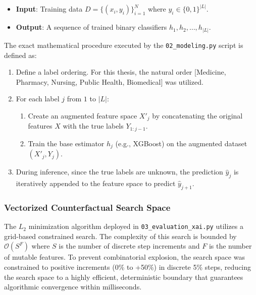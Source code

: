 \begin{itemize}
    \item \textbf{Input}: Training data $D = \{(x_i, y_i)\}_{i=1}^N$ where $y_i \in \{0,1\}^{|L|}$.
    \item \textbf{Output}: A sequence of trained binary classifiers $h_1, h_2, \dots, h_{|L|}$.
\end{itemize}
The exact mathematical procedure executed by the \texttt{02\_modeling.py} script is defined as:
\begin{enumerate}
    \item Define a label ordering. For this thesis, the natural order [Medicine, Pharmacy, Nursing, Public Health, Biomedical] was utilized.
    \item For each label $j$ from $1$ to $|L|$:
    \begin{enumerate}
        \item Create an augmented feature space $X'_j$ by concatenating the original features $X$ with the true labels $Y_{1:j-1}$.
        \item Train the base estimator $h_j$ (e.g., XGBoost) on the augmented dataset $(X'_j, Y_j)$.
    \end{enumerate}
    \item During inference, since the true labels are unknown, the prediction $\hat{y}_j$ is iteratively appended to the feature space to predict $\hat{y}_{j+1}$.
\end{enumerate}

\subsubsection{Vectorized Counterfactual \parencite{wachter2017counterfactual} Search Space}
The $L_2$ minimization algorithm deployed in \texttt{03\_evaluation\_xai.py} utilizes a grid-based constrained search. The complexity of this search is bounded by $\mathcal{O}(S^F)$ where $S$ is the number of discrete step increments and $F$ is the number of mutable features. 
To prevent combinatorial explosion, the search space was constrained to positive increments (0\% to +50\%) in discrete 5\% steps, reducing the search space to a highly efficient, deterministic boundary that guarantees algorithmic convergence within milliseconds.

